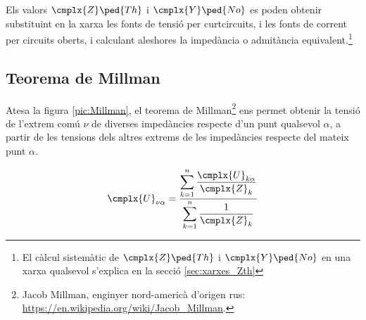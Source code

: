 Els valors $\cmplx{Z}\ped{Th}$ i  $\cmplx{Y}\ped{No}$ es poden
obtenir substituint en la xarxa  les fonts de tensió  per curtcircuits, i les fonts de corrent per circuits oberts, i calculant
aleshores la impedància o admitància equivalent.\footnote{El càlcul sistemàtic de $\cmplx{Z}\ped{Th}$ i  $\cmplx{Y}\ped{No}$ en una xarxa qualsevol s'explica en la secció \ref{sec:xarxes_Zth}}

\subsection{Teorema de Millman}\label{sec:millman}

Atesa la figura \vref{pic:Millman}, el teorema
de Millman\footnote{Jacob Millman, enginyer nord-americà d'origen rus: \href{https://en.wikipedia.org/wiki/Jacob_Millman}{https:/\!\!/en.wikipedia.org/wiki/Jacob\_Millman}.} ens permet
obtenir la tensió de l'extrem comú $\nu$ de diverses impedàncies respecte d'un punt
qualsevol $\alpha$, a partir de les tensions dels altres extrems de les impedàncies respecte  del mateix punt $\alpha$.

\hfill
\begin{minipage}[b]{7cm}
    
    \label{pic:Millman}
\end{minipage}
\hfill
\begin{minipage}[b][4.5cm][t]{6cm}
    \begin{equation}
        \cmplx{U}_{\nu\alpha} = \frac{\displaystyle\sum_{k=1}^n \dfrac{\cmplx{U}_{k\alpha}}{\cmplx{Z}_k}} {\displaystyle\sum_{k=1}^n \dfrac{1}{\cmplx{Z}_k}}
        \label{eq:millman}
    \end{equation}
\end{minipage}

\vspace{5mm}


